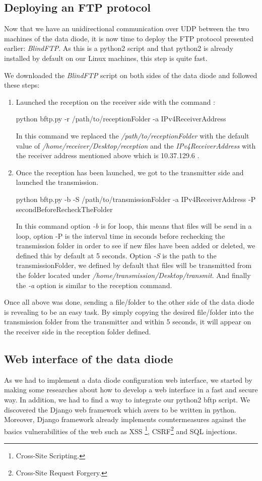 \documentclass[a4paper,10pt]{article}
\begin{document}
\subsection{Deploying an FTP protocol}
Now that we have an unidirectional communication over UDP between the two machines of the data diode, it is now time to deploy the FTP protocol presented earlier: \emph{BlindFTP}. As this is a python2 script and that python2 is already installed by default on our Linux machines, this step is quite fast.

We downloaded the \emph{BlindFTP} script on both sides of the data diode and followed these steps:
\begin{enumerate}
\item Launched the reception on the receiver side with the command : 
\begin{center}
python bftp.py -r /path/to/receptionFolder -a IPv4ReceiverAddress
\end{center}
In this command we replaced the \emph{/path/to/receptionFolder} with the default value of \emph{/home/receiver/Desktop/reception} and the \emph{IPv4ReceiverAddress} with the receiver address mentioned above which is 10.37.129.6 .

\item Once the reception has been launched, we got to the transmitter side and launched the transmission.
\begin{center}
python bftp.py -b -S /path/to/transmissionFolder -a IPv4ReceiverAddress -P secondBeforeRecheckTheFolder
\end{center}
In this command option \emph{-b} is for loop, this means that files will be send in a loop, option -P is the interval time in seconds before rechecking the transmission folder in order to see if new files have been added or deleted, we defined this by default at 5 seconds. Option \emph{-S} is the path to the transmissionFolder, we defined by default that files will be transmitted from the folder located under \emph{/home/transmission/Desktop/transmit}. And finally the \emph{-a} option is similar to the reception command.
\end{enumerate}

Once all above was done, sending a file/folder to the other side of the data diode is revealing to be an easy task. By simply copying the desired file/folder into the transmission folder from the transmitter and within 5 seconds, it will appear on the receiver side in the reception folder defined.

\subsection{Web interface of the data diode}
As we had to implement a data diode configuration web interface, we started by making some researches about how to develop a web interface in a fast and secure way. In addition, we had to find a way to integrate our python2 bftp script. We discovered the Django web framework which avers to be written in python. Moreover, Django framework already implements countermeasures against the basics vulnerabilities of the web such as XSS \footnote{Cross-Site Scripting.}, CSRF\footnote{Cross-Site Request Forgery.} and SQL injections.
\end{document}
